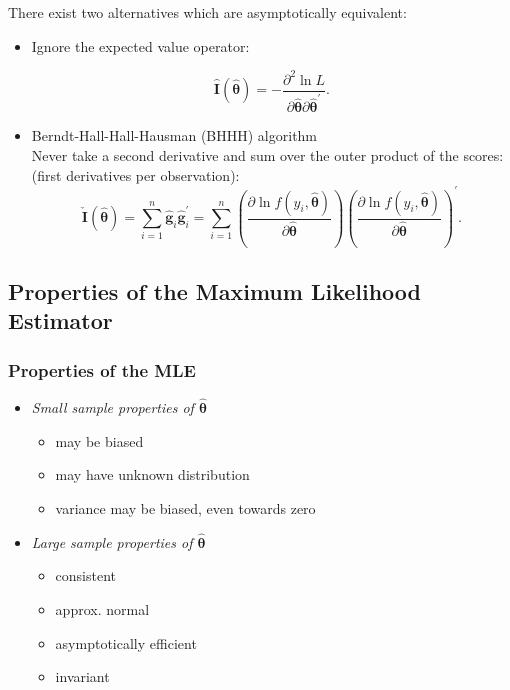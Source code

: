 \documentclass[a4paper,12pt]{article}
\def\emph{\textit}
\begin{document}
There exist two alternatives which are asymptotically equivalent:
\begin{itemize}
	\item Ignore the expected value operator:

$$
\widehat{\boldsymbol{I}}(\widehat{\boldsymbol{\theta}})=-\frac{\partial^{2} \ln L}{\partial \widehat{\boldsymbol{\theta}} \partial \widehat{\boldsymbol{\theta}}^{\prime}}.
$$
	\item Berndt-Hall-Hall-Hausman (BHHH) algorithm\\ Never take a second derivative and sum over the outer product of the scores: (first derivatives per observation):
$$
\check{\boldsymbol{I}}(\widehat{\boldsymbol{\theta}})=\sum_{i=1}^{n} \widehat{\boldsymbol{g}}_{i} \widehat{\boldsymbol{g}}_{i}^{\prime}=\sum_{i=1}^{n}\left(\frac{\partial \ln f\left(y_{i}, \widehat{\boldsymbol{\theta}}\right)}{\partial \widehat{\boldsymbol{\theta}}}\right)\left(\frac{\partial \ln f\left(y_{i}, \widehat{\boldsymbol{\theta}}\right)}{\partial \widehat{\boldsymbol{\theta}}}\right)^{\prime}.
$$
\end{itemize}



\subsection{Properties of the Maximum Likelihood Estimator}

\subsubsection*{Properties of the MLE}


\begin{itemize}
	\item \emph{Small sample properties of $\hat{\boldsymbol{\theta}}$}
\begin{itemize}
	\item may be biased
	\item may have unknown distribution
	\item variance may be biased, even towards zero\
\end{itemize}
	\item \emph{Large sample properties of $\hat{\boldsymbol{\theta}}$}
\begin{itemize}
	\item consistent
	\item approx. normal
	\item asymptotically efficient
	\item invariant
\end{itemize}
\end{itemize}
\end{document}
